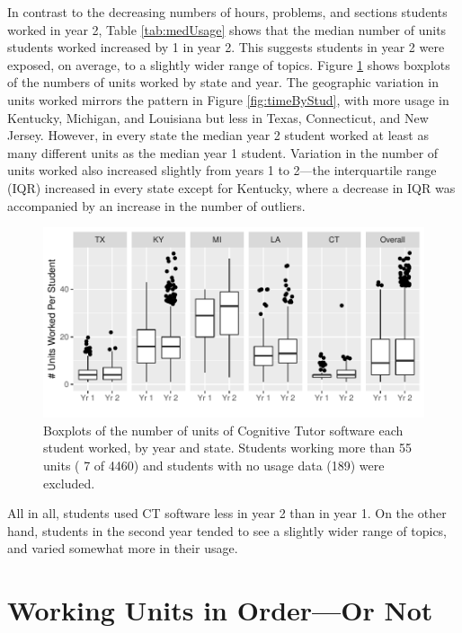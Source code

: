 \documentclass[notitlepage,12pt]{jedm}\usepackage[]{graphicx}\usepackage[]{color}
\makeatletter
\def\maxwidth{ %
  \ifdim\Gin@nat@width>\linewidth
    \linewidth
  \else
    \Gin@nat@width
  \fi
}
\makeatother
\begin{document}
In contrast to the decreasing numbers of hours, problems, and sections students
worked in year 2, Table \ref{tab:medUsage} shows that the median number of units
students worked increased by
1
in year 2.
This suggests students in year 2 were exposed, on average, to a
slightly wider range of topics.
Figure \ref{fig:unitsByStud} shows boxplots of the numbers of units
worked by state and year.
The geographic variation in units worked mirrors the pattern in Figure
\ref{fig:timeByStud}, with more usage in Kentucky, Michigan, and
Louisiana but less in Texas, Connecticut, and New Jersey.
However, in every state the median year 2 student worked at least as
many different units as the median year 1 student.
Variation in the number of units worked also increased slightly
from years 1 to 2---the interquartile range (IQR) increased in every state
except for Kentucky, where a decrease in IQR was accompanied by an
increase in the number of outliers.



\begin{figure}
\centering

\includegraphics[width=\maxwidth]{figure/unitsWorked-1} 

\caption{Boxplots of the number of units of Cognitive Tutor
  software each student worked, by year and state. Students
  working more than 55 units (
  7 of
  4460) and students
  with no usage data (189)
  were excluded.}
\label{fig:unitsByStud}
\end{figure}

All in all, students used CT software less in year 2 than in year
1.
On the other hand, students in the second year tended to see a
slightly wider range of topics, and varied somewhat more in their usage.



\section{Working Units in Order---Or Not}\label{sec:order}
\end{document}
